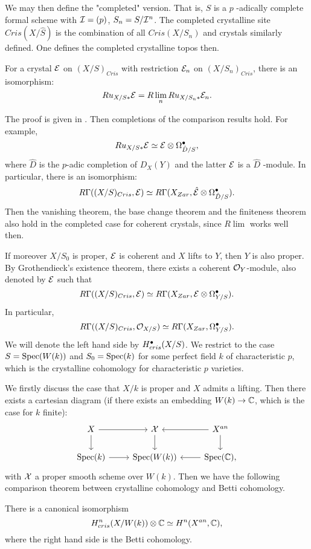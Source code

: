 We may then define the "completed" version. 
That is, $S$ is a $p$ -adically complete formal scheme with 
${\mathcal {I}} = (p)$, $S_n = S / {\mathcal {I}}^n$. 
The completed crystalline site $Cris(X/\hat{S})$ is 
the combination of all $Cris(X/S_n)$ and crystals similarly defined. 
One defines the completed crystalline topos then.
\begin{proposition}
    For a crystal ${\mathcal {E}}$ on $(X/S)_{Cris}$ 
    with restriction ${\mathcal {E}}_n$ on $(X/S_n)_{Cris}$, 
    there is an isomorphism:
    \[
        Ru_{X/S*} {\mathcal {E}} = R \lim_n Ru_{X/S_n*} {\mathcal {E}}_n.
    \]
\end{proposition}

The proof is given in \cite{BO}.
Then completions of the comparison results hold.
For example,
\[
    Ru_{X/S*} {\mathcal {E}} \simeq {\mathcal {E}} \otimes \Omega_{\hat{D}/S}^\bullet,
\]
where $\hat{D}$ is the $p$-adic completion of $D_X(Y)$ 
and the latter ${\mathcal {E}}$ is a $\hat{D}$ -module.
In particular, there is an isomorphism:
\[
    R \Gamma((X/S)_{Cris},{\mathcal {E}}) \simeq
    R \Gamma(X_{Zar}, \hat{{\mathcal {E}}} \otimes \Omega_{\hat{D}/S}^\bullet).
\]
Then the vanishing theorem, the base change theorem and the finiteness theorem 
also hold in the completed case for coherent crystals, 
since $R \lim$ works well then.

If moreover $X/S_0$ is proper, ${\mathcal {E}}$ is coherent 
and $X$ lifts to $Y$, then $Y$ is also proper. 
By Grothendieck's existence theorem, 
there exists a coherent ${\mathcal {O}}_Y$-module, 
also denoted by ${\mathcal {E}}$ such that 
\[
    R\Gamma((X/S)_{Cris},{\mathcal {E}}) \simeq 
    R\Gamma(X_{Zar},{\mathcal {E}}\otimes \Omega_{Y/S}^\bullet).
\]
In particular,
\[
    R\Gamma((X/S)_{Cris}, {\mathcal {O}}_{X/S}) \simeq 
    R \Gamma (X_{Zar}, \Omega_{Y/S}^\bullet).
\]
We will denote the left hand side by $H^\bullet_{cris}(X/S)$. 
We restrict to the case $S = \operatorname{Spec} (W(k))$ and 
$S_0 = \operatorname{Spec} (k)$ for some perfect field $k$ of characteristic $p$, 
which is the crystalline cohomology for characteristic $p$ varieties.

We firstly discuss the case that $X/k$ is proper and $X$ admits a lifting. 
Then there exists a cartesian diagram 
(if there exists an embedding $W(k) \to {\mathbb {C}}$, which is the case for $k$ finite):
\[
    \begin{tikzcd}
        X \ar[r] \ar[d] & \CX \ar[d] & X^{an} \ar[l] \ar[d] \\
        \Spec (k) \ar[r] & \Spec (W(k)) & \Spec (\BC) \ar[l],
    \end{tikzcd}
\]
with ${\mathcal {X}}$ a proper smooth scheme over $W(k)$. 
Then we have the following comparison theorem 
between crystalline cohomology and Betti cohomology.
\begin{theorem}
    There is a canonical isomorphism 
    \[
        H^n_{cris}(X/W(k)) \otimes {\mathbb {C}} \simeq H^n(X^{an}, {\mathbb {C}}),
    \]
    where the right hand side is the Betti cohomology.
\end{theorem}

